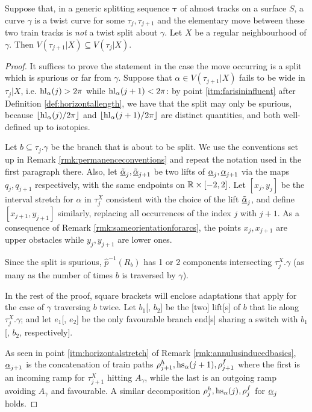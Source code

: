 \begin{lemma}\label{lem:vertexsetnontwist}
Suppose that, in a generic splitting sequence $\bm\tau$ of almost tracks on a surface $S$, a curve $\gamma$ is a twist curve for some $\tau_j,\tau_{j+1}$ and the elementary move between these two train tracks is \emph{not} a twist split about $\gamma$. Let $X$ be a regular neighbourhood of $\gamma$. Then $V(\tau_{j+1}|X)\subseteq V(\tau_{j}|X)$.
\end{lemma}
\begin{proof}
It suffices to prove the statement in the case the move occurring is a split which is spurious or far from $\gamma$. Suppose that $\alpha\in V(\tau_{j+1}|X)$ fails to be wide in $\tau_j|X$, i.e. $\mathrm{hl}_{\alpha}(j)>2\pi$ while $\mathrm{hl}_{\alpha}(j+1)<2\pi$: by point \ref{itm:farisininfluent} after Definition \ref{def:horizontallength}, we have that the split may only be spurious, because $\lfloor \mathrm{hl}_{\alpha}(j)/2\pi\rfloor$ and $\lfloor \mathrm{hl}_{\alpha}(j+1)/2\pi\rfloor$ are distinct quantities, and both well-defined up to isotopies. 

Let $b\subseteq \tau_j.\gamma$ be the branch that is about to be split. We use the conventions set up in Remark \ref{rmk:permanenceconventions} and repeat the notation used in the first paragraph there. Also, let $\tilde{\underline{\alpha}}_j, \tilde{\underline{\alpha}}_{j+1}$ be two lifts of $\underline{\alpha}_j, \underline{\alpha}_{j+1}$ via the maps $q_j,q_{j+1}$ respectively, with the same endpoints on $\mathbb R\times[-2,2]$. Let $[x_j,y_j]$ be the interval stretch for $\alpha$ in $\tau_j^X$ consistent with the choice of the lift $\tilde{\underline{\alpha}}_j$, and define $[x_{j+1},y_{j+1}]$ similarly, replacing all occurrences of the index $j$ with $j+1$. As a consequence of Remark \ref{rmk:sameorientationforarcs}, the points $x_j,x_{j+1}$ are upper obstacles while $y_j,y_{j+1}$ are lower ones.

Since the split is spurious, $\hat p^{-1}(R_b)$ has 1 or 2 components intersecting $\tau_j^X.\gamma$ (as many as the number of times $b$ is traversed by $\gamma$). 

In the rest of the proof, square brackets will enclose adaptations that apply for the case of $\gamma$ traversing $b$ twice. Let $b_1$[, $b_2$] be the [two] lift[s] of $b$ that lie along $\tau_j^X.\gamma$; and let $e_1$[, $e_2$] be the only favourable branch end[s] sharing a switch with $b_1$[, $b_2$, respectively]. 

As seen in point \ref{itm:horizontalstretch} of Remark \ref{rmk:annulusinducedbasics}, $\underline{\alpha}_{j+1}$ is the concatenation of train paths $\rho_{j+1}^h,\mathrm{hs}_\alpha(j+1),\rho_{j+1}^f$ where the first is an incoming ramp for $\tau_{j+1}^X$ hitting $A_\gamma$, while the last is an outgoing ramp avoiding $A_\gamma$ and favourable. A similar decomposition $\rho_j^h,\mathrm{hs}_\alpha(j),\rho_j^f$ for $\underline{\alpha}_j$ holds.


\end{proof}

